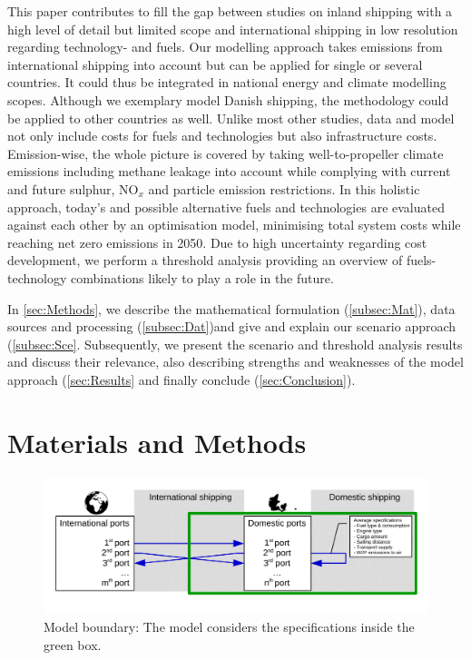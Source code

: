 \documentclass[article]{elsarticle}
\begin{document}
This paper contributes to fill the gap between studies on inland shipping  with a high level of detail but limited scope and international shipping in low resolution regarding technology- and fuels. Our modelling approach takes emissions from international shipping into account but can be applied for single or several countries. It could thus be integrated in national energy and climate modelling scopes. Although we exemplary model Danish shipping, the methodology could be applied to other countries as well.
Unlike most other studies, data and model not only include costs for fuels and technologies but also infrastructure costs. Emission-wise, the whole picture is covered by taking well-to-propeller climate emissions including methane leakage into account while complying with current and future sulphur, NO$_x$ and particle emission restrictions.
In this holistic approach, today's and possible alternative fuels and technologies are evaluated against each other by an optimisation model, minimising total system costs while reaching net zero emissions in 2050. Due to high uncertainty regarding cost development, we perform a threshold analysis providing an overview of fuels-technology combinations likely to play a role in the future.

In \autoref{sec:Methods}, we describe the mathematical formulation (\autoref{subsec:Mat}), data sources and processing (\autoref{subsec:Dat})and give and explain our scenario approach (\autoref{subsec:Sce}. Subsequently, we present the scenario and threshold analysis results and discuss their relevance, also describing strengths and weaknesses of the model approach (\autoref{sec:Results} and finally conclude (\autoref{sec:Conclusion}).  

\section{Materials and Methods}
\label{sec:Methods}

\begin{figure}[htb]
    \centering
    \includegraphics[width=\textwidth]{figures/model_boundary_paper.pdf}
    \caption{Model boundary: The model considers the specifications inside the green box.}
    \label{fig:model_boundary}
\end{figure}
\end{document}
